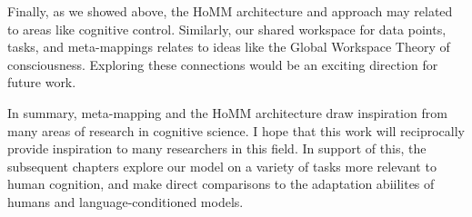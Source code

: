 Finally, as we showed above, the HoMM architecture and approach may related to areas like cognitive control. Similarly, our shared workspace for data points, tasks, and meta-mappings relates to ideas like the Global Workspace Theory of consciousness. Exploring these connections would be an exciting direction for future work. 

In summary, meta-mapping and the HoMM architecture draw inspiration from many areas of research in cognitive science. I hope that this work will reciprocally provide inspiration to many researchers in this field. In support of this, the subsequent chapters explore our model on a variety of tasks more relevant to human cognition, and make direct comparisons to the adaptation abiilites of humans and language-conditioned models. 

